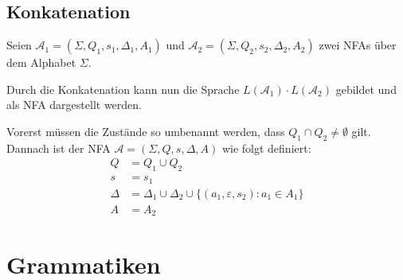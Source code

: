 \documentclass[a4paper, 11pt, accentcolor = tud3b]{tudreport}
\begin{document}


        \subsection{Konkatenation}
            Seien $ \mathcal{A} _ 1 = (\Sigma, Q _ 1, s _ 1, \Delta _ 1, A _ 1) $ und $ \mathcal{A} _ 2 = (\Sigma, Q _ 2, s _ 2, \Delta _ 2, A _ 2) $ zwei NFAs über dem Alphabet $ \Sigma $.

            Durch die Konkatenation kann nun die Sprache $ L(\mathcal{A} _ 1) \cdot L(\mathcal{A} _ 2) $ gebildet und als NFA dargestellt werden.

            Vorerst müssen die Zustände so umbenannt werden, dass $ Q _ 1 \cap Q _ 2 \neq \emptyset $ gilt. Dannach ist der NFA $ \mathcal{A} = (\Sigma, Q, s, \Delta, A) $ wie folgt definiert:
            \begin{equation*}
                \begin{split}
                    Q      & = Q _ 1 \cup Q _ 2
                    \\
                    s      & = s _ 1
                    \\
                    \Delta & = \Delta _ 1 \cup \Delta _ 2 \cup \{ (a _ 1, \varepsilon, s _ 2) : a _ 1 \in A _ 1 \}
                    \\
                    A      & = A _ 2
                \end{split}
            \end{equation*}



    \section{Grammatiken}
\end{document}
